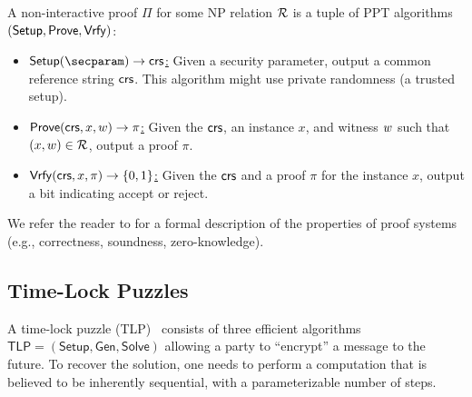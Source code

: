 \begin{definition} A non-interactive proof $\Pi$ for some NP relation $\mathcal{R}$ is a tuple of PPT algorithms $(\mathsf{Setup}, \mathsf{Prove}, \mathsf{Vrfy})$:
    \begin{itemize}
        \item \underline{$\setup(\secparam) \rightarrow \crs$:} Given a security parameter, output a common reference string $\mathsf{crs}$. This algorithm might use private randomness (a trusted setup).
        \item \underline{$\mathsf{Prove}(\mathsf{crs}, x, w) \rightarrow \pi$:} Given the $\mathsf{crs}$, an instance $x$, and witness $w$ such that $(x, w) \in \mathcal{R}$, output a proof $\pi$.
        \item \underline{$\mathsf{Vrfy}(\mathsf{crs}, x,\pi) \rightarrow \{0,1\}$:} Given the $\mathsf{crs}$ and a proof $\pi$ for the instance $x$, output a bit indicating accept or reject.
    \end{itemize}
\end{definition}

We refer the reader to \cite{Thaler23} for a formal description of the properties of proof systems (e.g., correctness, soundness, zero-knowledge). 


\subsection{Time-Lock Puzzles}\label{sec:tlp}

A time-lock puzzle (TLP)~\cite{RivShaWag96} consists of three efficient algorithms $\mathsf{TLP} = (\mathsf{Setup}, \mathsf{Gen}, \mathsf{Solve})$ allowing a party to ``encrypt'' a message to the future. To recover the solution, one needs to perform a computation that is believed to be inherently sequential, with a parameterizable number of steps.

